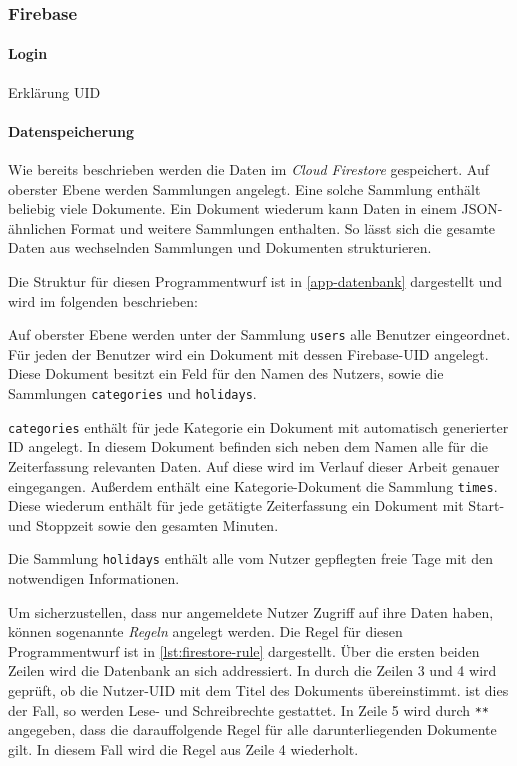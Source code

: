 \subsubsection{Firebase}
\paragraph{Login}
Erklärung UID

\paragraph{Datenspeicherung}
Wie bereits beschrieben werden die Daten im \textit{Cloud Firestore} gespeichert.
Auf oberster Ebene werden Sammlungen angelegt.
Eine solche Sammlung enthält beliebig viele Dokumente.
Ein Dokument wiederum kann Daten in einem JSON-ähnlichen Format und weitere Sammlungen enthalten.
So lässt sich die gesamte Daten aus wechselnden Sammlungen und Dokumenten strukturieren.

Die Struktur für diesen Programmentwurf ist in \autoref{app-datenbank} dargestellt und wird im folgenden beschrieben:

Auf oberster Ebene werden unter der Sammlung \texttt{users} alle Benutzer eingeordnet.
Für jeden der Benutzer wird ein Dokument mit dessen Firebase-UID angelegt.
Diese Dokument besitzt ein Feld für den Namen des Nutzers,
sowie die Sammlungen \texttt{categories} und \texttt{holidays}.

\texttt{categories} enthält für jede Kategorie ein Dokument mit automatisch generierter ID angelegt.
In diesem Dokument befinden sich neben dem Namen alle für die Zeiterfassung relevanten Daten.
Auf diese wird im Verlauf dieser Arbeit genauer eingegangen.
Außerdem enthält eine Kategorie-Dokument die Sammlung \texttt{times}.
Diese wiederum enthält für jede getätigte Zeiterfassung ein Dokument mit Start- und Stoppzeit sowie den gesamten Minuten.

Die Sammlung \texttt{holidays} enthält alle vom Nutzer gepflegten freie Tage mit den notwendigen Informationen.

Um sicherzustellen, dass nur angemeldete Nutzer Zugriff auf ihre Daten haben,
können sogenannte \textit{Regeln} angelegt werden.
Die Regel für diesen Programmentwurf ist in \autoref{lst:firestore-rule} dargestellt.
Über die ersten beiden Zeilen wird die Datenbank an sich addressiert.
In durch die Zeilen 3 und 4 wird geprüft, ob die Nutzer-UID mit dem Titel des Dokuments übereinstimmt.
ist dies der Fall, so werden Lese- und Schreibrechte gestattet.
In Zeile 5 wird durch \lstinline[language=firestoreRule]{**} angegeben,
dass die darauffolgende Regel für alle darunterliegenden Dokumente gilt.
In diesem Fall wird die Regel aus Zeile 4 wiederholt.

